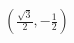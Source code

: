 \documentclass[preview]{standalone}
\begin{document}
\begin{align*}
\left(\frac{\sqrt{3}}{2}, -\frac{1}{2}\right)
\end{align*}
\end{document}
